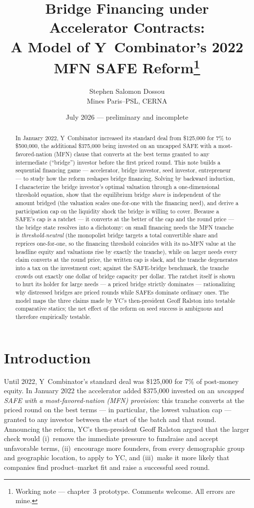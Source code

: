 \documentclass[11pt]{article}
\title{Bridge Financing under Accelerator Contracts:\\
A Model of Y~Combinator's 2022 MFN SAFE Reform\thanks{Working note --- chapter~3 prototype. Comments welcome. All errors are mine.}}
\author{Stephen Salomon Dossou\\
\small Mines Paris--PSL, CERNA}
\date{July 2026 --- preliminary and incomplete}
\theoremstyle{definition}
\begin{document}
\maketitle

\begin{abstract}
\noindent In January 2022, Y~Combinator increased its standard deal from \$125{,}000 for 7\% to \$500{,}000, the additional \$375{,}000 being invested on an uncapped SAFE with a most-favored-nation (MFN) clause that converts at the best terms granted to any intermediate (``bridge'') investor before the first priced round. This note builds a sequential financing game --- accelerator, bridge investor, seed investor, entrepreneur --- to study how the reform reshapes bridge financing. Solving by backward induction, I characterize the bridge investor's optimal valuation through a one-dimensional threshold equation, show that the equilibrium bridge \emph{share} is independent of the amount bridged (the valuation scales one-for-one with the financing need), and derive a participation cap on the liquidity shock the bridge is willing to cover. Because a SAFE's cap is a ratchet --- it converts at the better of the cap and the round price --- the bridge state resolves into a dichotomy: on small financing needs the MFN tranche is \emph{threshold-neutral} (the monopolist bridge targets a total convertible share and reprices one-for-one, so the financing threshold coincides with its no-MFN value at the headline equity and valuations rise by exactly the tranche), while on larger needs every claim converts at the round price, the written cap is slack, and the tranche degenerates into a tax on the investment cost; against the SAFE-bridge benchmark, the tranche crowds out exactly one dollar of bridge capacity per dollar. The ratchet itself is shown to hurt its holder for large needs --- a priced bridge strictly dominates --- rationalizing why distressed bridges are priced rounds while SAFEs dominate ordinary ones. The model maps the three claims made by YC's then-president Geoff Ralston into testable comparative statics; the net effect of the reform on seed success is ambiguous and therefore empirically testable.
\end{abstract}

\section{Introduction}

Until 2022, Y~Combinator's standard deal was \$125{,}000 for 7\% of post-money equity. In January 2022 the accelerator added \$375{,}000 invested on an \emph{uncapped SAFE with a most-favored-nation (MFN) provision}: this tranche converts at the priced round on the best terms --- in particular, the lowest valuation cap --- granted to any investor between the start of the batch and that round. Announcing the reform, YC's then-president Geoff Ralston argued that the larger check would (i)~remove the immediate pressure to fundraise and accept unfavorable terms, (ii)~encourage more founders, from every demographic group and geographic location, to apply to YC, and (iii)~make it more likely that companies find product--market fit and raise a successful seed round.
\end{document}
